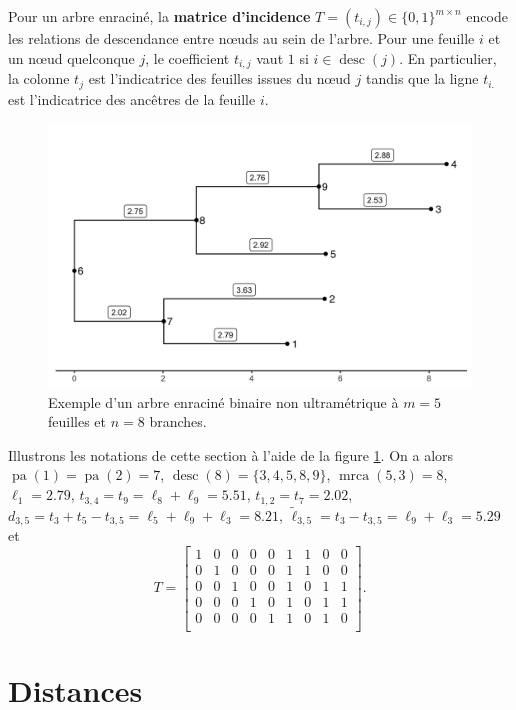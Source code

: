 \documentclass[12pt,a4paper]{reedthesis}
\DeclareMathOperator*{\pa}{pa}
\DeclareMathOperator*{\mrca}{mrca}
\DeclareMathOperator*{\desc}{desc}
\theoremstyle{definition}
\theoremstyle{definition}
\theoremstyle{definition}
\theoremstyle{remark}
\begin{document}
Pour un arbre enraciné, la \textbf{matrice d'incidence} \(T = (t_{i,j}) \in\{0,1\}^{m \times n}\) encode les relations de descendance entre nœuds au sein de l'arbre. Pour une feuille \(i\) et un nœud quelconque \(j\), le coefficient \(t_{i,j}\) vaut \(1\) si \(i \in \desc(j)\). En particulier, la colonne \(t_j\) est l'indicatrice des feuilles issues du nœud \(j\) tandis que la ligne \(t_{i.}\) est l'indicatrice des ancêtres de la feuille \(i\).


\begin{figure}

{\centering \includegraphics[width=0.9\linewidth]{img/tree_raw} 

}

\caption{Exemple d'un arbre enraciné binaire non ultramétrique à \(m = 5\) feuilles et \(n = 8\) branches.}\label{fig:treeraw}
\end{figure}
Illustrons les notations de cette section à l'aide de la figure \ref{fig:treeraw}. On a alors \(\pa(1) = \pa(2) = 7\), \(\desc(8) = \{3, 4, 5, 8, 9\}\), \(\mrca(5, 3) = 8\), \(\ell_1 = 2.79\), \(t_{3,4} = t_9 = \ell_8 + \ell_9 = 5.51\), \(t_{1,2} = t_7 = 2.02\), \(d_{3,5} = t_3 + t_5 - t_{3,5} = \ell_5 + \ell_9 + \ell_3 = 8.21\), \(\tilde{\ell}_{3,5} = t_3 - t_{3,5} = \ell_9 + \ell_3 = 5.29\) et
\begin{equation*}
T = 
\begin{bmatrix}
1 & 0 & 0 & 0 & 0 & 1 & 1 & 0 & 0 \\
0 & 1 & 0 & 0 & 0 & 1 & 1 & 0 & 0 \\
0 & 0 & 1 & 0 & 0 & 1 & 0 & 1 & 1 \\
0 & 0 & 0 & 1 & 0 & 1 & 0 & 1 & 1 \\
0 & 0 & 0 & 0 & 1 & 1 & 0 & 1 & 0 \\
\end{bmatrix}.
\end{equation*}
\hypertarget{distances}{%
\section{Distances}\label{distances}}
\end{document}
